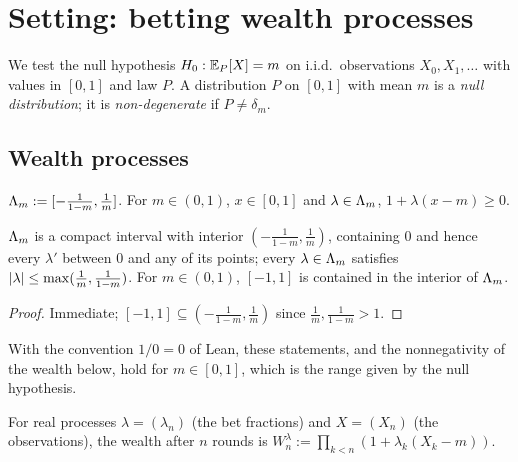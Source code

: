 \chapter{Setting: betting wealth processes}
\label{chap:setting}

We test the null hypothesis $H_0 : \mathbb{E}_P[X] = m$ on i.i.d.\ observations $X_0, X_1, \dots$ with
values in $[0, 1]$ and law $P$. A distribution $P$ on $[0,1]$ with mean $m$ is a \emph{null
distribution}; it is \emph{non-degenerate} if $P \ne \delta_m$.

\section{Wealth processes}

\begin{definition}
  \label{def:fraction_range}
  \leanok
  $\Lambda_m := [-\frac{1}{1-m}, \frac{1}{m}]$. For $m \in (0,1)$, $x \in [0,1]$ and $\lambda \in \Lambda_m$,
  $1 + \lambda(x - m) \ge 0$.
\end{definition}

\begin{lemma}
  \label{lem:fraction_range_basic}
  \leanok
  $\Lambda_m$ is a compact interval with interior $(-\frac{1}{1-m}, \frac{1}{m})$, containing $0$ and
  hence every $\lambda'$ between $0$ and any of its points; every $\lambda \in \Lambda_m$ satisfies
  $\lvert \lambda \rvert \le \max(\frac1m, \frac{1}{1-m})$. For $m \in (0,1)$, $[-1, 1]$ is contained in the
  interior of $\Lambda_m$.
\end{lemma}

\begin{proof}
  \leanok
  Immediate; $[-1,1] \subseteq (-\frac{1}{1-m}, \frac1m)$ since $\frac1m, \frac{1}{1-m} > 1$.
\end{proof}

With the convention $1/0 = 0$ of Lean, these statements, and the nonnegativity of the wealth below,
hold for $m \in [0, 1]$, which is the range given by the null hypothesis.


\begin{definition}[Wealth]
  \label{def:wealth}
  \leanok
  For real processes $\lambda = (\lambda_n)$ (the bet fractions) and $X = (X_n)$ (the observations),
  the wealth after $n$ rounds is $W^\lambda_n := \prod_{k < n} (1 + \lambda_k (X_k - m))$.
\end{definition}


